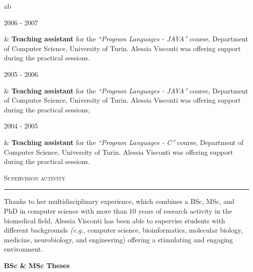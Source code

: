 \documentclass[a4paper,10pt]{article}
\newcommand{\mediumtitle}[1]{
	\vspace{0.2cm}
	{\noindent
	\Large \textsc{#1}\\[-2ex]
	\hrule
	\vspace{0.2cm}}
}
\newenvironment{singletablelist}
{	\vspace{-0.2cm}
	\begin{longtable}[!h]{ab}}{\end{longtable}
}
\newcommand{\stlist}[2]{
	\hspace{-3cm}
	\noindent
	\begin{minipage}{0.24\textwidth}
	\begin{flushright}
	\textsc{#1}
	\end{flushright}
	\end{minipage}
	& #2\\[0.2cm]
}
\begin{document}
\begin{singletablelist}
	\stlist{2006 - 2007}{\textbf{Teaching assistant} for the \emph{``Program Languages - JAVA''} course, Department of Computer Science, University of Turin. Alessia Visconti was offering support during the practical sessions. }
	\stlist{2005 - 2006}{\textbf{Teaching assistant} for the \emph{``Program Languages - JAVA''} course, Department of Computer Science, University of Turin. Alessia Visconti was offering support during the practical sessions,}
	\stlist{2004 - 2005}{\textbf{Teaching assistant}  for the \emph{``Program Languages - C''} course, Department of Computer Science, University of Turin. Alessia Visconti was offering support during the practical sessions.}
\end{singletablelist}



\mediumtitle{Supervision activity}


\noindent
Thanks to her multidisciplinary experience, which combines a BSc, MSc, and PhD in computer science with more than 10 years of research activity in the biomedical field, Alessia Visconti has been able to supervise students with different backgrounds \emph{(e.g.}, computer science, bioinformatics, molecular biology, medicine, neurobiology, and engineering) offering a stimulating and engaging environment.

\vspace{0.4cm}

\noindent \textbf{BSc \& MSc Theses}
\end{document}
